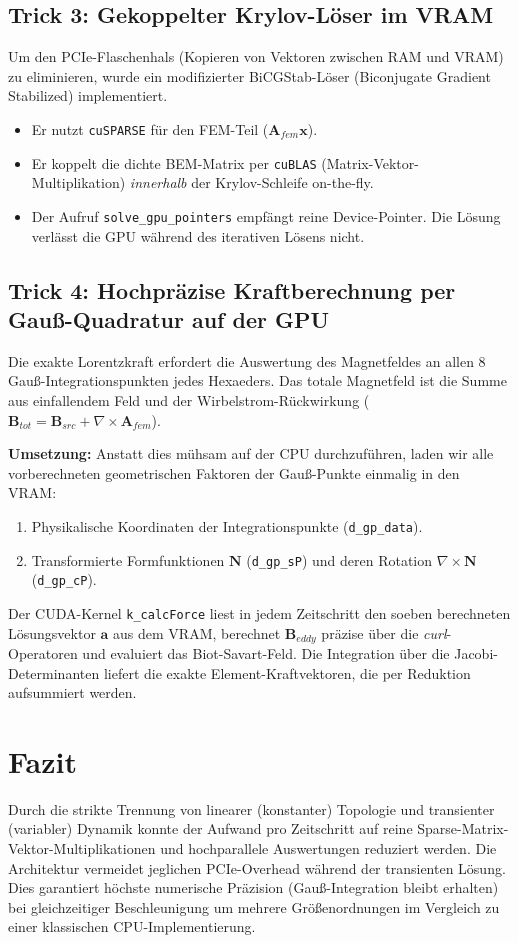 \documentclass[11pt, a4paper]{article}
\begin{document}
\subsection{Trick 3: Gekoppelter Krylov-Löser im VRAM}
Um den PCIe-Flaschenhals (Kopieren von Vektoren zwischen RAM und VRAM) zu eliminieren, wurde ein modifizierter BiCGStab-Löser (Biconjugate Gradient Stabilized) implementiert. 
\begin{itemize}
    \item Er nutzt \texttt{cuSPARSE} für den FEM-Teil ($\mathbf{A}_{fem} \mathbf{x}$).
    \item Er koppelt die dichte BEM-Matrix per \texttt{cuBLAS} (Matrix-Vektor-Multiplikation) \textit{innerhalb} der Krylov-Schleife on-the-fly.
    \item Der Aufruf \texttt{solve\_gpu\_pointers} empfängt reine Device-Pointer. Die Lösung verlässt die GPU während des iterativen Lösens nicht.
\end{itemize}

\subsection{Trick 4: Hochpräzise Kraftberechnung per Gauß-Quadratur auf der GPU}
Die exakte Lorentzkraft erfordert die Auswertung des Magnetfeldes an allen 8 Gauß-Integrationspunkten jedes Hexaeders. Das totale Magnetfeld ist die Summe aus einfallendem Feld und der Wirbelstrom-Rückwirkung ($\mathbf{B}_{tot} = \mathbf{B}_{src} + \nabla \times \mathbf{A}_{fem}$). 

\textbf{Umsetzung:}
Anstatt dies mühsam auf der CPU durchzuführen, laden wir alle vorberechneten geometrischen Faktoren der Gauß-Punkte einmalig in den VRAM:
\begin{enumerate}
    \item Physikalische Koordinaten der Integrationspunkte (\texttt{d\_gp\_data}).
    \item Transformierte Formfunktionen $\mathbf{N}$ (\texttt{d\_gp\_sP}) und deren Rotation $\nabla \times \mathbf{N}$ (\texttt{d\_gp\_cP}).
\end{enumerate}
Der CUDA-Kernel \texttt{k\_calcForce} liest in jedem Zeitschritt den soeben berechneten Lösungsvektor $\mathbf{a}$ aus dem VRAM, berechnet $\mathbf{B}_{eddy}$ präzise über die \textit{curl}-Operatoren und evaluiert das Biot-Savart-Feld. Die Integration über die Jacobi-Determinanten liefert die exakte Element-Kraftvektoren, die per Reduktion aufsummiert werden.

\section{Fazit}
Durch die strikte Trennung von linearer (konstanter) Topologie und transienter (variabler) Dynamik konnte der Aufwand pro Zeitschritt auf reine Sparse-Matrix-Vektor-Multiplikationen und hochparallele Auswertungen reduziert werden. Die Architektur vermeidet jeglichen PCIe-Overhead während der transienten Lösung. Dies garantiert höchste numerische Präzision (Gauß-Integration bleibt erhalten) bei gleichzeitiger Beschleunigung um mehrere Größenordnungen im Vergleich zu einer klassischen CPU-Implementierung.
\end{document}
